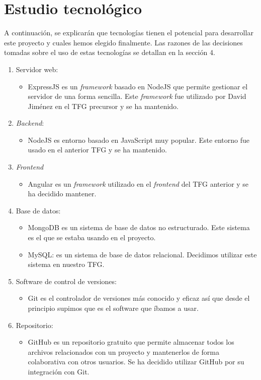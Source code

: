 \documentclass[11pt]{book}
\begin{document}
\section{Estudio tecnológico}
 A continuación, se explicarán que tecnologías tienen el potencial para desarrollar este proyecto y cuales hemos elegido finalmente. Las razones de las decisiones tomadas sobre el uso de estas tecnologías se detallan en la sección 4.
\begin{enumerate} 
	\item Servidor web:
	\begin{itemize} 
		\item ExpressJS es un \textit{framework} basado en NodeJS que permite gestionar el servidor de una forma sencilla. Este \textit{framework} fue utilizado por David Jiménez en el TFG precursor y se ha mantenido.
	\end{itemize}
	\item \emph{Backend}: 
	\begin{itemize} 
		\item NodeJS es entorno basado en JavaScript muy popular. Este entorno fue usado en el anterior TFG y se ha mantenido.
	\end{itemize}
	\item \emph{Frontend}
	\begin{itemize} 
		\item Angular es un \textit{framework} utilizado en el \textit{frontend} del TFG anterior y se ha decidido mantener.
	\end{itemize}
	\item Base de datos: 
	\begin{itemize} 
		\item MongoDB es un sistema de base de datos no estructurado. Este sistema es el que se estaba usando en el proyecto.
		\item MySQL: es un sistema de base de datos relacional. Decidimos utilizar este sistema en nuestro TFG.
	\end{itemize}
	\item Software de control de versiones:
	\begin{itemize} 
		\item Git es el controlador de versiones más conocido y eficaz así que desde el principio supimos que es el software que íbamos a usar. 
	\end{itemize}
	\item Repositorio: 
	\begin{itemize} 
		\item GitHub es un repositorio gratuito que permite almacenar todos los archivos relacionados con un proyecto y mantenerlos de forma colaborativa con otros usuarios. Se ha decidido utilizar GitHub por su integración con Git.

\end{itemize}
\end{enumerate}
\end{document}
